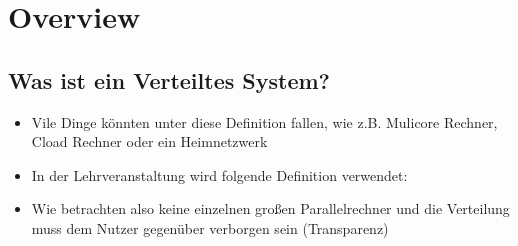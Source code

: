 \section{Overview}

\subsection{Was ist ein Verteiltes System?}
\begin{itemize}
      \item Vile Dinge könnten unter diese Definition fallen, wie z.B. Mulicore Rechner, Cload Rechner oder ein Heimnetzwerk
      \item In der Lehrveranstaltung wird folgende Definition verwendet:\\
      \item Wie betrachten also keine einzelnen großen Parallelrechner und die Verteilung muss dem Nutzer gegenüber verborgen sein (Transparenz)
\end{itemize}

